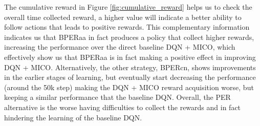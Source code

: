 The cumulative reward in Figure \ref{fig:cumulative_reward} helps us to check the overall time collected reward, a higher value will indicate a better ability to follow actions that leads to positive rewards. This complementary information indicates us that BPERaa in fact produces a policy that collect higher rewards, increasing the performance over the direct baseline DQN + MICO, which effectively show us that BPERaa is in fact making a positive effect in improving DQN + MICO. Alternatively, the other strategy, BPERcn, shows improvements in the earlier stages of learning, but eventually start decreasing the performance (around the 50k step) making the DQN + MICO reward acquisition worse, but keeping a similar performance that the baseline DQN. Overall, the PER alternative is the worse having difficulties to collect the rewards and in fact hindering the learning of the baseline DQN. 

